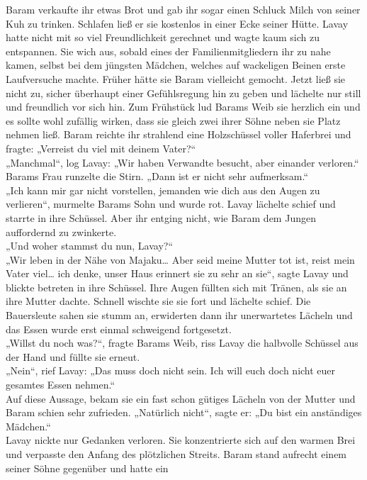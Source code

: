 Baram verkaufte ihr etwas Brot und gab ihr sogar einen Schluck Milch von seiner Kuh zu trinken. 
Schlafen ließ er sie kostenlos in einer Ecke seiner Hütte. Lavay hatte nicht mit so viel 
Freundlichkeit gerechnet und wagte kaum sich zu entspannen. Sie wich aus, sobald eines der 
Familienmitgliedern ihr zu nahe kamen, selbst bei dem jüngsten Mädchen, welches auf wackeligen 
Beinen erste Laufversuche machte. Früher hätte sie Baram vielleicht gemocht. Jetzt ließ sie nicht 
zu, sicher überhaupt einer Gefühlsregung hin zu geben und lächelte nur still und freundlich vor 
sich hin. 
Zum Frühstück lud Barams Weib sie herzlich ein und es sollte wohl zufällig wirken, dass sie gleich 
zwei ihrer Söhne neben sie Platz nehmen ließ. Baram reichte ihr strahlend eine Holzschüssel voller 
Haferbrei und fragte: „Verreist du viel mit deinem Vater?“\\
„Manchmal“, log Lavay: „Wir haben Verwandte besucht, aber einander verloren.“\\
Barams Frau runzelte die Stirn. „Dann ist er nicht sehr aufmerksam.“\\
„Ich kann mir gar nicht vorstellen, jemanden wie dich aus den Augen zu verlieren“, murmelte Barams 
Sohn und wurde rot. Lavay lächelte schief und starrte in ihre Schüssel. Aber ihr entging nicht, wie 
Baram dem Jungen auffordernd zu zwinkerte.\\
„Und woher stammst du nun, Lavay?“\\
„Wir leben in der Nähe von Majaku… Aber seid meine Mutter tot ist, reist mein Vater viel… ich denke, 
unser Haus erinnert sie zu sehr an sie“, sagte Lavay und blickte betreten in ihre Schüssel. Ihre 
Augen füllten sich mit Tränen, als sie an ihre Mutter dachte. Schnell wischte sie sie fort und 
lächelte schief. Die Bauersleute sahen sie stumm an, erwiderten dann ihr unerwartetes Lächeln und 
das Essen wurde erst einmal schweigend fortgesetzt.\\
„Willst du noch was?“, fragte Barams Weib, riss Lavay die halbvolle Schüssel aus der Hand und füllte 
sie erneut.\\
 „Nein“, rief Lavay: „Das muss doch nicht sein. Ich will euch doch nicht euer gesamtes Essen 
nehmen.“\\
Auf diese Aussage, bekam sie ein fast schon gütiges Lächeln von der Mutter und Baram schien sehr 
zufrieden. „Natürlich nicht“, sagte er: „Du bist ein anständiges Mädchen.“\\
Lavay nickte nur Gedanken verloren. Sie konzentrierte sich auf den warmen Brei und verpasste den 
Anfang des plötzlichen Streits. Baram stand aufrecht einem seiner Söhne gegenüber und hatte ein 
